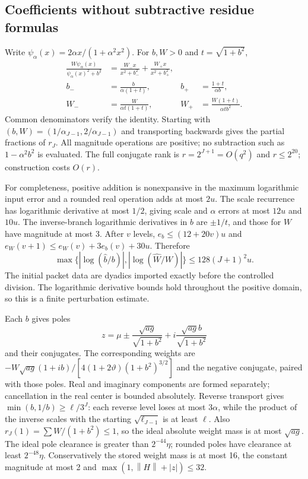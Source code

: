 \documentclass[11pt]{article}
\theoremstyle{remark}\newtheorem{remark}[theorem]{Remark}
\newcommand{\norm}[1]{\left\lVert#1\right\rVert}
\newcommand{\abs}[1]{\left\lvert#1\right\rvert}
\begin{document}
\subsection{Coefficients without subtractive residue formulas}
Write $\psi_\alpha(x)=2\alpha x/(1+\alpha^2x^2)$. For $b,W>0$ and
$t=\sqrt{1+b^2}$,
\begin{align}\label{eq:transport}
 \frac{W\psi_\alpha(x)}{\psi_\alpha(x)^2+b^2}
 &=\frac{W_-x}{x^2+b_-^2}+\frac{W_+x}{x^2+b_+^2},\\[-4pt]
 b_-&=\frac b{\alpha(1+t)},& b_+&=\frac{1+t}{\alpha b},\nonumber\\
 W_-&=\frac W{\alpha t(1+t)},&W_+&=\frac{W(1+t)}{\alpha t b^2}.\nonumber
\end{align}
Common denominators verify the identity. Starting with
$(b,W)=(1/\alpha_{J-1},2/\alpha_{J-1})$ and transporting backwards gives
the partial fractions of $r_J$. All magnitude operations are positive; no
subtraction such as $1-\alpha^2b^2$ is evaluated. The full conjugate rank is
$r=2^{J+1}=O(q^2)$ and $r\le2^{20}$; construction costs $O(r)$.

For completeness, positive addition is nonexpansive in the maximum
logarithmic input error and a rounded real operation adds at most $2u$.
The scale recurrence has logarithmic derivative at most $1/2$, giving scale
and $\alpha$ errors at most $12u$ and $10u$. The inverse-branch logarithmic
derivatives in $b$ are $\pm1/t$, and those for $W$ have magnitude at most 3.
After $v$ levels, $e_b\le(12+20v)u$ and
$e_W(v+1)\le e_W(v)+3e_b(v)+30u$. Therefore
\begin{equation}\label{eq:coeflog}
 \max\{\abs{\log(\widehat b/b)},\abs{\log(\widehat W/W)}\}
 \le128(J+1)^2u.
\end{equation}
The initial packet data are dyadics imported exactly before the controlled
division. The logarithmic derivative bounds hold throughout the positive
domain, so this is a finite perturbation estimate.

Each $b$ gives poles
\[
 z=\mu\pm\frac{\sqrt{ag}}{\sqrt{1+b^2}}
       +i\frac{\sqrt{ag}b}{\sqrt{1+b^2}}
\]
and their conjugates. The corresponding weights are
$-W\sqrt{ag}(1+ib)/[4(1+2\vartheta)(1+b^2)^{3/2}]$ and the negative
conjugate, paired with those poles. Real and imaginary components are formed
separately; cancellation in the real center is bounded absolutely.
Reverse transport gives $\min(b,1/b)\ge\ell/3^J$: each reverse level loses
at most $3\alpha$, while the product of the inverse scales with the starting
$\sqrt{\ell_{J-1}}$ is at least $\ell$. Also
$r_J(1)=\sum W/(1+b^2)\le1$, so the ideal absolute weight mass is at most
$\sqrt{ag}$. The ideal pole clearance is greater than $2^{-44}\eta$;
rounded poles have clearance at least $2^{-48}\eta$. Conservatively the
stored weight mass is at most 16, the constant magnitude at most 2 and
$\max(1,\norm H+\abs z)\le32$.
\end{document}
